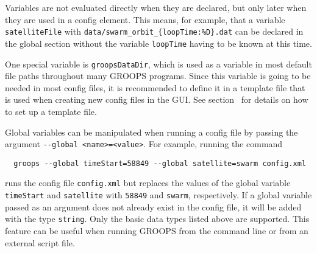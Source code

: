 Variables are not evaluated directly when they are declared, but only later when they are used in a config element.
This means, for example, that a variable \verb|satelliteFile| with \verb|data/swarm_orbit_{loopTime:%D}.dat|
can be declared in the global section without the variable \verb|loopTime| having to be known at this time.

One special variable is \verb|groopsDataDir|, which is used as a variable in most default
file paths throughout many GROOPS programs. Since this variable is going to be needed in
most config files, it is recommended to define it in a template file that is used when creating
new config files in the GUI. See section~
for details on how to set up a template file.

Global variables can be manipulated when running a config file by passing the argument \verb|--global <name>=<value>|.
For example, running the command
\begin{verbatim}
  groops --global timeStart=58849 --global satellite=swarm config.xml
\end{verbatim}
runs the config file \verb|config.xml| but replaces the values of the global variable \verb|timeStart|
and \verb|satellite| with \verb|58849| and \verb|swarm|, respectively. If a global variable passed as
an argument does not already exist in the config file, it will be added with the type \verb|string|.
Only the basic data types listed above are supported. This feature can be useful when running GROOPS
from the command line or from an external script file.
